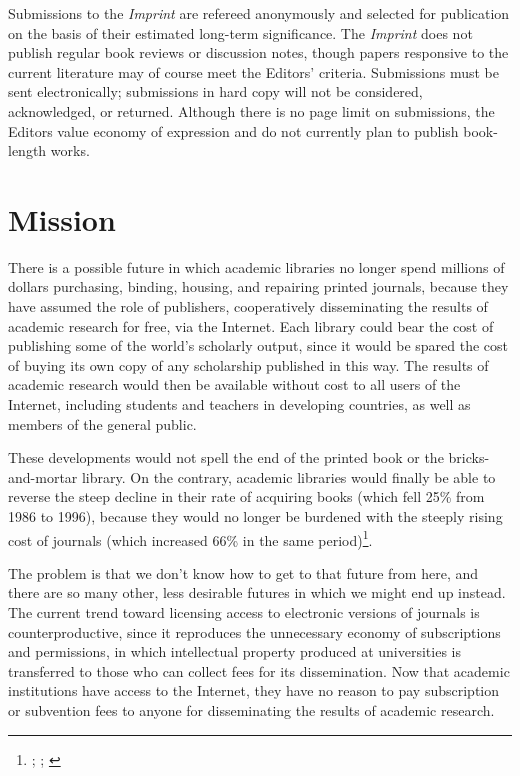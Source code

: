 \documentclass[noflushend]{philosophersimprint}
\begin{document}
Submissions to the \emph{Imprint} are refereed anonymously and
selected for publication on the basis of their estimated long-term
significance.  The \emph{Imprint} does not publish regular book
reviews or discussion notes, though papers responsive to the current
literature may of course meet the Editors' criteria. Submissions must
be sent electronically; submissions in hard copy will not be
considered, acknowledged, or returned. Although there is no page limit
on submissions, the Editors value economy of expression and do not
currently plan to publish book-length works.


\section{Mission}

\vspace*{-0.25\baselineskip}
There is a possible future in which academic libraries no longer spend
millions of dollars purchasing, binding, housing, and repairing
printed journals, because they have assumed the role of publishers,
cooperatively disseminating the results of academic research for free,
via the Internet. Each library could bear the cost of publishing some
of the world's scholarly output, since it would be spared the cost of
buying its own copy of any scholarship published in this way. The
results of academic research would then be available without cost to
all users of the Internet, including students and teachers in
developing countries, as well as members of the general public. 

These developments would not spell the end of the printed book or the
bricks-and-mortar library. On the contrary, academic libraries would
finally be able to reverse the steep decline in their rate of
acquiring books (which fell 25\% from 1986 to 1996), because they
would no longer be burdened with the steeply rising cost of journals
(which increased 66\% in the same
period)\footnote{\cite{Harnad99:FreeAtLast}; \cite{NewSystems};
  \cite{ScholarsForum}}.

The problem is that we don't know how to get to that future from here,
and there are so many other, less desirable futures in which we might
end up instead. The current trend toward licensing access to
electronic versions of journals is counterproductive, since it
reproduces the unnecessary economy of subscriptions and permissions,
in which intellectual property produced at universities is transferred
to those who can collect fees for its dissemination. Now that academic
institutions have access to the Internet, they have no reason to pay
subscription or subvention fees to anyone for disseminating the
results of academic research.
\end{document}
